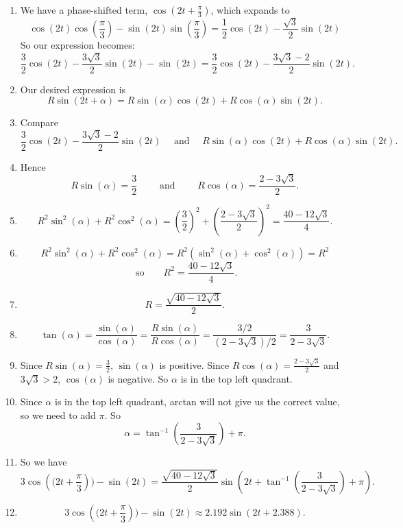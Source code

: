 \documentclass{article}
\begin{document}
\begin{enumerate}
\item We have a phase-shifted term, $\cos\left(2t+\frac{\pi}{3}\right)$, which expands to
	\[\cos(2t)\cos\left(\frac{\pi}{3}\right)-\sin(2t)\sin\left(\frac{\pi}{3}\right)=\frac{1}{2}\cos(2t)-\frac{\sqrt{3}}{2}\sin(2t)\]
	So our expression becomes:
	\[\frac{3}{2}\cos(2t)-\frac{3\sqrt{3}}{2}\sin(2t)-\sin(2t)=\frac{3}{2}\cos(2t)-\frac{3\sqrt{3}-2}{2}\sin(2t).\]
\item Our desired expression is
	\[R\sin(2t+\alpha)=R\sin(\alpha)\cos(2t)+R\cos(\alpha)\sin(2t).\]
\item Compare
	\[\frac{3}{2}\cos(2t)-\frac{3\sqrt{3}-2}{2}\sin(2t)\quad\mbox{  and  }\quad R\sin(\alpha)\cos(2t)+R\cos(\alpha)\sin(2t).\]
\item Hence
	\[R\sin(\alpha)=\frac{3}{2}\qquad\mbox{ and }\qquad R\cos(\alpha)=\frac{2-3\sqrt{3}}{2}.\]
\item \[R^2\sin^2(\alpha)+R^2\cos^2(\alpha)=\left(\frac{3}{2}\right)^2+\left(\frac{2-3\sqrt{3}}{2}\right)^2=\frac{40-12\sqrt{3}}{4}.\]
\item \[R^2\sin^2(\alpha)+R^2\cos^2(\alpha)=R^2(\sin^2(\alpha)+\cos^2(\alpha))=R^2\]
	\[\mbox{ so}\qquad R^2=\frac{40-12\sqrt{3}}{4}.\]
\item \[R=\frac{\sqrt{40-12\sqrt{3}}}{2}.\]
\item \[\tan(\alpha)=\frac{\sin(\alpha)}{\cos(\alpha)}=\frac{R\sin(\alpha)}{R\cos(\alpha)}=\frac{3/2}{(2-3\sqrt{3})/2}=\frac{3}{2-3\sqrt{3}}.\]
\item Since $R\sin(\alpha)=\frac{3}{2}$, $\sin(\alpha)$ is positive. Since $R\cos(\alpha)=\frac{2-3\sqrt{3}}{2}$ and $3\sqrt{3}>2$, $\cos(\alpha)$ is negative. So $\alpha$ is in the top left 		quadrant.
\item Since $\alpha$ is in the top left quadrant, arctan will not give us the correct value, so we need to add $\pi$. So
	\[\alpha=\tan^{-1}\left(\frac{3}{2-3\sqrt{3}}\right)+\pi.\]
\item So we have
	\[3\cos\left((2t+\frac{\pi}{3}\right))-\sin(2t)=\frac{\sqrt{40-12\sqrt{3}}}{2}\sin\left(2t+\tan^{-1}\left(\frac{3}{2-3\sqrt{3}}\right)+\pi\right).\]
\item \[3\cos\left((2t+\frac{\pi}{3}\right))-\sin(2t)\approx 2.192\sin(2t+2.388).\]
\end{enumerate}
\end{document}
